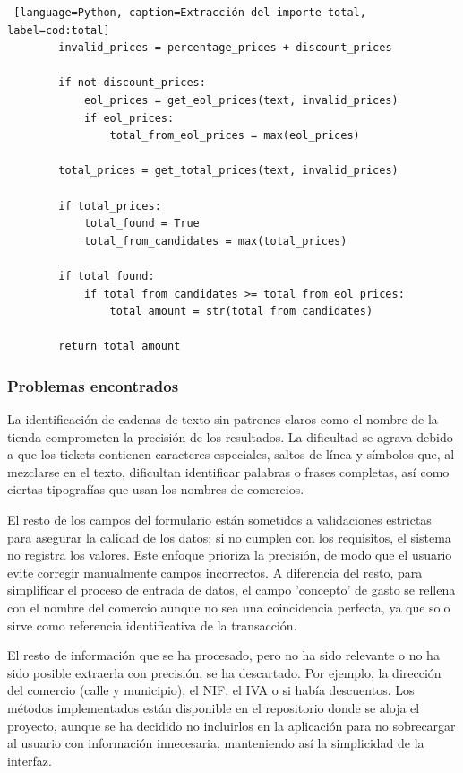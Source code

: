 \begin{itemize}
\begin{lstlisting} [language=Python, caption=Extracción del importe total, label=cod:total]
        invalid_prices = percentage_prices + discount_prices

        if not discount_prices:
            eol_prices = get_eol_prices(text, invalid_prices)         
            if eol_prices:
                total_from_eol_prices = max(eol_prices)
        
        total_prices = get_total_prices(text, invalid_prices)

        if total_prices:
            total_found = True
            total_from_candidates = max(total_prices)      
        
        if total_found:
            if total_from_candidates >= total_from_eol_prices:
                total_amount = str(total_from_candidates)

        return total_amount
    \end{lstlisting}
\end{itemize}


\subsubsection{Problemas encontrados}
La identificación de cadenas de texto sin patrones claros como el nombre de la tienda comprometen la precisión de los resultados. La dificultad se agrava debido a que los tickets contienen caracteres especiales, saltos de línea y símbolos que, al mezclarse en el texto, dificultan identificar palabras o frases completas, así como ciertas tipografías que usan los nombres de comercios. 

El resto de los campos del formulario están sometidos a validaciones estrictas para asegurar la calidad de los datos; si no cumplen con los requisitos, el sistema no registra los valores. Este enfoque prioriza la precisión, de modo que el usuario evite corregir manualmente campos incorrectos. A diferencia del resto, para simplificar el proceso de entrada de datos, el campo 'concepto' de gasto se rellena con el nombre del comercio aunque no sea una coincidencia perfecta, ya que solo sirve como referencia identificativa de la transacción.

El resto de información que se ha procesado, pero no ha sido relevante o no ha sido posible extraerla con precisión, se ha descartado. Por ejemplo, la dirección del comercio (calle y municipio), el NIF, el IVA o si había descuentos. Los métodos implementados están disponible en el repositorio donde se aloja el proyecto, aunque se ha decidido no incluirlos en la aplicación para no sobrecargar al usuario con información innecesaria, manteniendo así la simplicidad de la interfaz.


